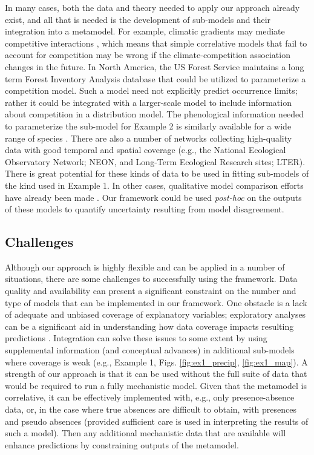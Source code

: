 \documentclass[11pt]{article}
\begin{document}
In many cases, both the data and theory needed to apply our approach already exist, and all that is needed is the development of sub-models and their integration into a metamodel.
For example, climatic gradients may mediate competitive interactions \citep{Kunstler2011}, which means that simple correlative models that fail to account for competition may be wrong if the climate-competition association changes in the future.
In North America, the US Forest Service maintains a long term Forest Inventory Analysis database that could be utilized to parameterize a competition model.
Such a model need not explicitly predict occurrence limits; rather it could be integrated with a larger-scale model to include information about competition in a distribution model.
The phenological information needed to parameterize the sub-model for Example 2 is similarly available for a wide range of species \citep{Morin2009}.
There are also a number of networks collecting high-quality data with good temporal and spatial coverage (e.g., the National Ecological Observatory Network; NEON, and Long-Term Ecological Research sites; LTER).
There is great potential for these kinds of data to be used in fitting sub-models of the kind used in Example 1.
In other cases, qualitative model comparison efforts have already been made \citep{Morin2009, Cheaib2012}.
Our framework could be used \emph{post-hoc} on the outputs of these models to quantify uncertainty resulting from model disagreement.


\subsection*{Challenges} 
Although our approach is highly flexible and can be applied in a number of situations, there are some challenges to successfully using the framework.
Data quality and availability can present a significant constraint on the number and type of models that can be implemented in our framework.
One obstacle is a lack of adequate and unbiased coverage of explanatory variables; exploratory analyses can be a significant aid in understanding how data coverage impacts resulting predictions \citep{Mckenney2002}.
Integration can solve these issues to some extent by using supplemental information (and conceptual advances) in additional sub-models where coverage is weak (e.g., Example 1, Figs. \ref{fig:ex1_precip}, \ref{fig:ex1_map}).
A strength of our approach is that it can be used without the full suite of data that would be required to run a fully mechanistic model. 
Given that the metamodel is correlative, it can be effectively implemented with, e.g., only presence-absence data, or, in the case where true absences are difficult to obtain, with presences and pseudo absences (provided sufficient care is used in interpreting the results of such a model).
Then any additional mechanistic data that are available will enhance predictions by constraining outputs of the metamodel. 
\end{document}
